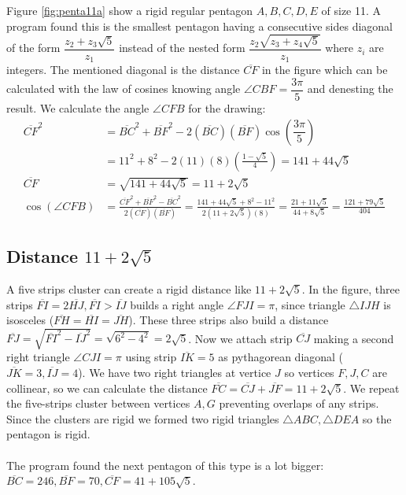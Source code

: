 \documentclass[11pt]{article}
\begin{document}
Figure \ref{fig:penta11a} show a rigid regular pentagon $A,B,C,D,E$ of size 11. A program found this is the smallest pentagon having a consecutive sides diagonal of the form $\dfrac{z_2 + z_3\sqrt5}{z_1}$ instead of the nested form $\dfrac{z_2\sqrt{z_3+z_4\sqrt5}}{z_1}$ where $z_i$ are integers. The mentioned diagonal is the distance $\overline{CF}$ in the figure which can be calculated with the law of cosines knowing angle $\angle{CBF} = \dfrac{3\pi}5$ and denesting the result. We calculate the angle $\angle{CFB}$ for the drawing:
\begin{align}
\overline{CF}^2 &= \overline{BC}^2 + \overline{BF}^2 
 - 2(\overline{BC})(\overline{BF})\cos\left(\dfrac{3\pi}5\right) \nonumber\\
 &= 11^2 + 8^2 - 2(11)(8)\left(\frac{1-\sqrt5}4\right) = 141 + 44\sqrt5 \nonumber\\
\overline{CF} &= \sqrt{141 + 44\sqrt5} = 11 + 2\sqrt5\\
%
\cos(\angle{CFB}) &= \frac{\overline{CF}^2 + \overline{BF}^2 - \overline{BC}^2}
 {2(\overline{CF})(\overline{BF})}%
 = \frac{141+44\sqrt5 + 8^2 - 11^2}{2(11+2\sqrt5)(8)}
  = \frac{21+11\sqrt5}{44+8\sqrt5} = \frac{121+79\sqrt5}{404}
\end{align}

\subsection{Distance $11+2\sqrt{5}$}

A five strips cluster can create a rigid distance like $11 + 2\sqrt{5}$. In the figure, three strips $\overline{FI} = 2\overline{HJ}, \overline{FI} > \overline{IJ}$ builds a right angle $\angle{FJI} = \pi$, since triangle $\triangle{IJH}$ is isosceles ($\overline{FH} = \overline{HI} = \overline{JH}$). These three strips also build a distance $\overline{FJ} = \sqrt{\overline{FI}^2 - \overline{IJ}^2} = \sqrt{6^2 - 4^2} = 2\sqrt5$. Now we attach strip $\overline{CJ}$ making a second right triangle $\angle{CJI} = \pi$ using strip $\overline{IK}=5$ as pythagorean diagonal ($\overline{JK}=3, \overline{IJ}=4$). We have two right triangles at vertice $J$ so vertices $F,J,C$ are collinear, so we can calculate the distance $\overline{FC} = \overline{CJ} + \overline{JF} = 11 + 2\sqrt5$. We repeat the five-strips cluster between vertices $A,G$ preventing overlaps of any strips. Since the clusters are rigid we formed two rigid triangles $\triangle{ABC}, \triangle{DEA}$ so the pentagon is rigid.
\\\\
The program found the next pentagon of this type is a lot bigger: $\overline{BC}=246, \overline{BF}=70, \overline{CF}=41+105\sqrt5$.
\end{document}
